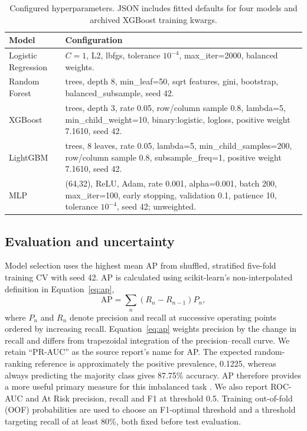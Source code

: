 \documentclass[runningheads]{llncs}
\begin{document}
\begin{table}[!htbp]\caption{Configured hyperparameters. JSON includes fitted defaults for four models and archived XGBoost training kwargs.}\label{tab:params}\centering\small\begin{tabular}{>{\raggedright\arraybackslash}p{}>{\raggedright\arraybackslash}p{}}\toprule Model & Configuration \\ \midrule
Logistic Regression & $C=1$, L2, lbfgs, tolerance $10^{-4}$, max\_iter=2000, balanced weights. \\
Random Forest & 300 trees, depth 8, min\_leaf=50, sqrt features, gini, bootstrap, balanced\_subsample, seed 42. \\
XGBoost & 300 trees, depth 3, rate 0.05, row/column sample 0.8, lambda=5, min\_child\_weight=10, binary:logistic, logloss, positive weight 7.1610, seed 42. \\
LightGBM & 300 trees, 8 leaves, rate 0.05, lambda=5, min\_child\_samples=200, row/column sample 0.8, subsample\_freq=1, positive weight 7.1610, seed 42. \\
MLP & (64,32), ReLU, Adam, rate 0.001, alpha=0.001, batch 200, max\_iter=100, early stopping, validation 0.1, patience 10, tolerance $10^{-4}$, seed 42; unweighted. \\
\bottomrule\end{tabular}\end{table}


\subsection{Evaluation and uncertainty}
Model selection uses the highest mean AP from shuffled, stratified five-fold training CV with seed 42. AP is calculated using scikit-learn's non-interpolated definition in Equation~\eqref{eq:ap},
\begin{equation}\mathrm{AP}=\sum_n(R_n-R_{n-1})P_n,\label{eq:ap}\end{equation}
where $P_n$ and $R_n$ denote precision and recall at successive operating points ordered by increasing recall. Equation~\eqref{eq:ap} weights precision by the change in recall and differs from trapezoidal integration of the precision--recall curve. We retain ``PR-AUC'' as the source report's name for AP. The expected random-ranking reference is approximately the positive prevalence, 0.1225, whereas always predicting the majority class gives 87.75\% accuracy. AP therefore provides a more useful primary measure for this imbalanced task \cite{saito}. We also report ROC-AUC and At Risk precision, recall and F1 at threshold 0.5. Training out-of-fold (OOF) probabilities are used to choose an F1-optimal threshold and a threshold targeting recall of at least 80\%, both fixed before test evaluation.
\end{document}
